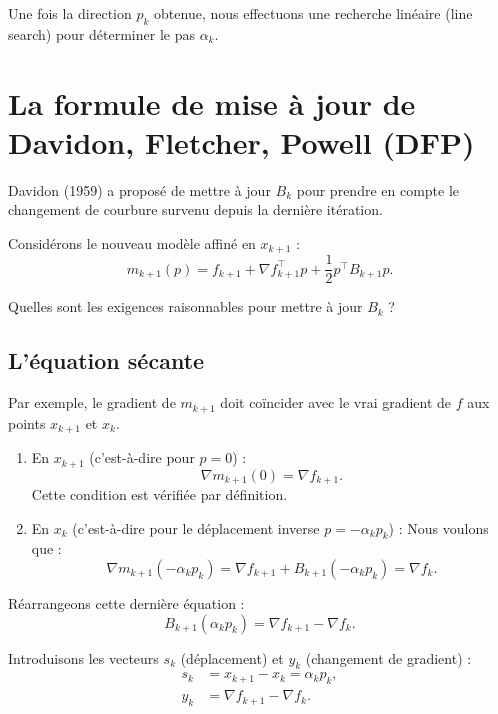 Une fois la direction $p_k$ obtenue, nous effectuons une recherche linéaire (line search) pour déterminer le pas $\alpha_k$.

\section{La formule de mise à jour de Davidon, Fletcher, Powell (DFP)}
\label{sec:dfp}

Davidon (1959) a proposé de mettre à jour $B_k$ pour prendre en compte le changement de courbure survenu depuis la dernière itération.

Considérons le nouveau modèle affiné en $x_{k+1}$ :
\begin{equation}
    m_{k+1}(p) = f_{k+1} + \nabla f_{k+1}^\top p + \frac{1}{2} p^\top B_{k+1} p.
\end{equation}

Quelles sont les exigences raisonnables pour mettre à jour $B_k$ ?

\subsection{L'équation sécante}

Par exemple, le gradient de $m_{k+1}$ doit coïncider avec le vrai gradient de $f$ aux points $x_{k+1}$ et $x_k$.

\begin{enumerate}
    \item En $x_{k+1}$ (c'est-à-dire pour $p=0$) :
    \[ \nabla m_{k+1}(0) = \nabla f_{k+1}. \]
    Cette condition est vérifiée par définition.

    \item En $x_k$ (c'est-à-dire pour le déplacement inverse $p = -\alpha_k p_k$) :
    Nous voulons que :
    \begin{equation}
        \nabla m_{k+1}(-\alpha_k p_k) = \nabla f_{k+1} + B_{k+1}(-\alpha_k p_k) = \nabla f_k.
    \end{equation}
\end{enumerate}

Réarrangeons cette dernière équation :
\[
    B_{k+1} (\alpha_k p_k) = \nabla f_{k+1} - \nabla f_k.
\]

Introduisons les vecteurs $s_k$ (déplacement) et $y_k$ (changement de gradient) :
\begin{align}
    s_k &= x_{k+1} - x_k = \alpha_k p_k, \\
    y_k &= \nabla f_{k+1} - \nabla f_k.
\end{align}

